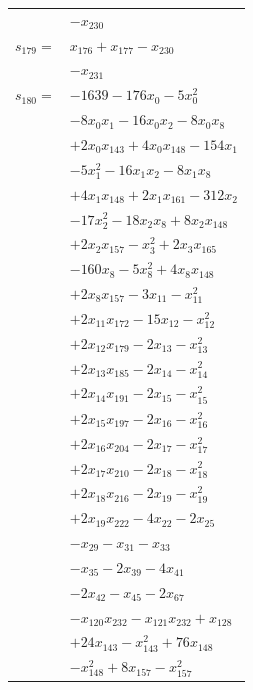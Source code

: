 \begin{longtable}{@{}r@{\;}l@{}}
 & \(\displaystyle -x_{230}\) \\[3pt]
\(s_{179}=\) & \(\displaystyle x_{176} +x_{177} -x_{230}\) \\
 & \(\displaystyle -x_{231}\) \\[3pt]
\(s_{180}=\) & \(\displaystyle -1639 -176x_{0} -5x_{0}^{2}\) \\
 & \(\displaystyle -8x_{0}x_{1} -16x_{0}x_{2} -8x_{0}x_{8}\) \\
 & \(\displaystyle +2x_{0}x_{143} +4x_{0}x_{148} -154x_{1}\) \\
 & \(\displaystyle -5x_{1}^{2} -16x_{1}x_{2} -8x_{1}x_{8}\) \\
 & \(\displaystyle +4x_{1}x_{148} +2x_{1}x_{161} -312x_{2}\) \\
 & \(\displaystyle -17x_{2}^{2} -18x_{2}x_{8} +8x_{2}x_{148}\) \\
 & \(\displaystyle +2x_{2}x_{157} -x_{3}^{2} +2x_{3}x_{165}\) \\
 & \(\displaystyle -160x_{8} -5x_{8}^{2} +4x_{8}x_{148}\) \\
 & \(\displaystyle +2x_{8}x_{157} -3x_{11} -x_{11}^{2}\) \\
 & \(\displaystyle +2x_{11}x_{172} -15x_{12} -x_{12}^{2}\) \\
 & \(\displaystyle +2x_{12}x_{179} -2x_{13} -x_{13}^{2}\) \\
 & \(\displaystyle +2x_{13}x_{185} -2x_{14} -x_{14}^{2}\) \\
 & \(\displaystyle +2x_{14}x_{191} -2x_{15} -x_{15}^{2}\) \\
 & \(\displaystyle +2x_{15}x_{197} -2x_{16} -x_{16}^{2}\) \\
 & \(\displaystyle +2x_{16}x_{204} -2x_{17} -x_{17}^{2}\) \\
 & \(\displaystyle +2x_{17}x_{210} -2x_{18} -x_{18}^{2}\) \\
 & \(\displaystyle +2x_{18}x_{216} -2x_{19} -x_{19}^{2}\) \\
 & \(\displaystyle +2x_{19}x_{222} -4x_{22} -2x_{25}\) \\
 & \(\displaystyle -x_{29} -x_{31} -x_{33}\) \\
 & \(\displaystyle -x_{35} -2x_{39} -4x_{41}\) \\
 & \(\displaystyle -2x_{42} -x_{45} -2x_{67}\) \\
 & \(\displaystyle -x_{120}x_{232} -x_{121}x_{232} +x_{128}\) \\
 & \(\displaystyle +24x_{143} -x_{143}^{2} +76x_{148}\) \\
 & \(\displaystyle -x_{148}^{2} +8x_{157} -x_{157}^{2}\) \\

\end{longtable}
